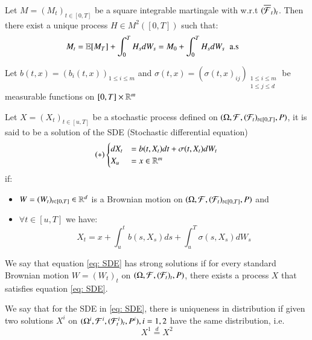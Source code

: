 \begin{theorem}
\label{thm: Martingale_rep_thm}
Let $M = (M_{t})_{t \in [0,T]}$ be a square integrable martingale with w.r.t $(\overline{\mathcal{F}}_{t})_{t}$. Then there exist a unique process $H\in M^{2}([0,T])$ such that: 
\begin{align*}
M_{t} &= \mathbb{E}[M_{T}] + \int_{0}^{T}H_{s}dW_{s} 
= M_{0} + \int_{0}^{T}H_{s}dW_{s} \;\; \text{a.s}
\end{align*}
\end{theorem}

Let $b(t,x) = (b_{i}(t,x))_{1\leq i \leq m}$ and
$\sigma(t,x) = (\sigma(t,x)_{ij})_{\substack{1\leq i\leq m\\1\leq j\leq d}}$ be measurable functions on $[0,T]\times \mathbb{R}^{m}$

\newpage 

\begin{definition}
Let $X = (X_{t})_{t\in [u,T]}$ be a stochastic process defined on $(\Omega, \mathcal{F}, (\mathcal{F}_{t})_{t\in [0,T]}, P)$, it is said to be a solution of the SDE  (Stochastic differential equation)
\begin{align*}
(*)\begin{cases}
      dX_{t} &= b(t,X_{t})dt + \sigma(t,X_{t})dW_{t} \\
      X_{u} &= x \in \mathbb{R}^{m}
    \end{cases}       
\end{align*}
if: 
\begin{itemize}[leftmargin =*]
    \item $W = (W_{t})_{t\in [0,T]} \in \mathbb{R}^{d}$ is a Brownian motion on $(\Omega, \mathcal{F}, (\mathcal{F}_{t})_{t\in [0,T]}, P)$ and
    \item $\forall t \in [u,T]$ we have:
    $$
    X_{t} = x + \int_{u}^{t}b(s,X_{s})ds + \int_{u}^{T}\sigma(s,X_{s})dW_{s}
    $$
\end{itemize}
\end{definition}

\begin{definition}
We say that equation \ref{eq: SDE} has strong solutions if for every standard Brownian motion $W = (W_{t})_{t}$ on $(\Omega, \mathcal{F}, (\mathcal{F}_{t})_{t}, P)$, there exists a process $X$ that satisfies equation \ref{eq: SDE}.    
\end{definition} 

\begin{definition}
We say that for the SDE in \ref{eq: SDE}, there is uniqueness in distribution if given two solutions $X^{i}$ on $(\Omega^{i}, \mathcal{F}^{i}, (\mathcal{F}_{t}^{i})_{t}, P^{i}), i = 1,2$ have the same distribution, i.e.
\[
X^{1} \stackrel{d}{=} X^{2}
\]
\end{definition}

